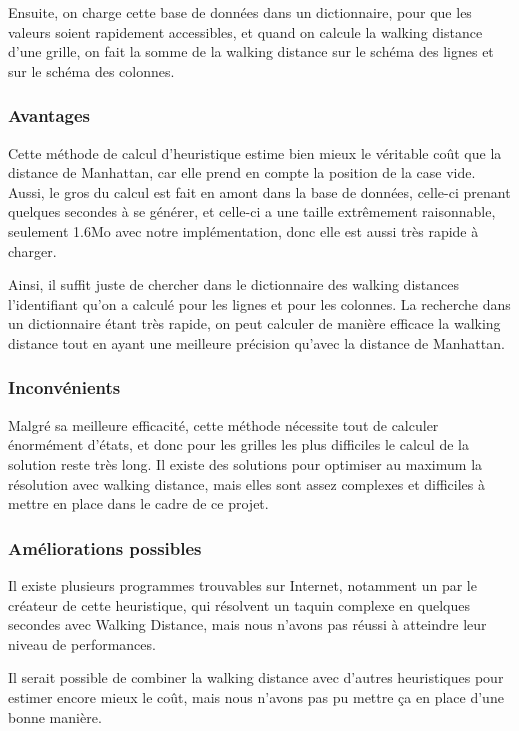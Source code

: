 \documentclass[a4paper, 12pt]{article}
\begin{document}
Ensuite, on charge cette base de données dans un dictionnaire, pour que les valeurs soient rapidement accessibles, et quand on calcule la walking distance d'une grille, on fait la somme de la walking distance sur le schéma des lignes et sur le schéma des colonnes.

\subsubsection{Avantages}

Cette méthode de calcul d'heuristique estime bien mieux le véritable coût que la distance de Manhattan, car elle prend en compte la position de la case vide. Aussi, le gros du calcul est fait en amont dans la base de données, celle-ci prenant quelques secondes à se générer, et celle-ci a une taille extrêmement raisonnable, seulement 1.6Mo avec notre implémentation, donc elle est aussi très rapide à charger.

Ainsi, il suffit juste de chercher dans le dictionnaire des walking distances l'identifiant qu'on a calculé pour les lignes et pour les colonnes.
La recherche dans un dictionnaire étant très rapide, on peut calculer de manière efficace la walking distance tout en ayant une meilleure précision qu'avec la distance de Manhattan.

\subsubsection{Inconvénients}

Malgré sa meilleure efficacité, cette méthode nécessite tout de calculer énormément d'états, et donc pour les grilles les plus difficiles le calcul de la solution reste très long.
Il existe des solutions pour optimiser au maximum la résolution avec walking distance, mais elles sont assez complexes et difficiles à mettre en place dans le cadre de ce projet.

\subsubsection{Améliorations possibles}

Il existe plusieurs programmes trouvables sur Internet, notamment un par le créateur de cette heuristique, qui résolvent un taquin complexe en quelques secondes avec Walking Distance, mais nous n'avons pas réussi à atteindre leur niveau de performances.

Il serait possible de combiner la walking distance avec d'autres heuristiques pour estimer encore mieux le coût, mais nous n'avons pas pu mettre ça en place d'une bonne manière.
\end{document}
